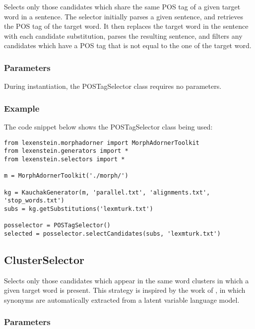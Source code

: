 Selects only those candidates which share the same POS tag of a given target word in a sentence. The selector initially parses a given sentence, and retrieves the POS tag of the target word. It then replaces the target word in the sentence with each candidate substitution, parses the resulting sentence, and filters any candidates which have a POS tag that is not equal to the one of the target word.

\subsubsection{Parameters}

During instantiation, the POSTagSelector class requires no parameters.

\subsubsection{Example}

The code snippet below shows the POSTagSelector class being used:

\begin{lstlisting}
from lexenstein.morphadorner import MorphAdornerToolkit
from lexenstein.generators import *
from lexenstein.selectors import *

m = MorphAdornerToolkit('./morph/')

kg = KauchakGenerator(m, 'parallel.txt', 'alignments.txt', 'stop_words.txt')
subs = kg.getSubstitutions('lexmturk.txt')

posselector = POSTagSelector()
selected = posselector.selectCandidates(subs, 'lexmturk.txt')
\end{lstlisting}














\subsection{ClusterSelector}

Selects only those candidates which appear in the same word clusters in which a given target word is present. This strategy is inspired by the work of \cite{Belder2010}, in which synonyms are automatically extracted from a latent variable language model.

\subsubsection{Parameters}

